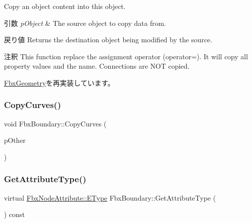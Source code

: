 Copy an object content into this object. 
\begin{DoxyParams}{引数}
{\em p\+Object} & The source object to copy data from. \\
\hline
\end{DoxyParams}
\begin{DoxyReturn}{戻り値}
Returns the destination object being modified by the source. 
\end{DoxyReturn}
\begin{DoxyRemark}{注釈}
This function replace the assignment operator (operator=). It will copy all property values and the name. Connections are N\+OT copied. 
\end{DoxyRemark}


\hyperlink{class_fbx_geometry_aac1cee4251e3d5fbd27f1181c58b83b3}{Fbx\+Geometry}を再実装しています。

\mbox{\label{class_fbx_boundary_ae41addb147733da9216a785bc6d003c3}} 
\subsubsection{\texorpdfstring{Copy\+Curves()}{CopyCurves()}}
{\footnotesize\ttfamily void Fbx\+Boundary\+::\+Copy\+Curves (\begin{DoxyParamCaption}\item[{\hyperlink{class_fbx_boundary}{Fbx\+Boundary} const \&}]{p\+Other }\end{DoxyParamCaption})}

\mbox{\label{class_fbx_boundary_a093be9c6c0c0f13a337e9b6815aed9d0}} 
\subsubsection{\texorpdfstring{Get\+Attribute\+Type()}{GetAttributeType()}}
{\footnotesize\ttfamily virtual \hyperlink{class_fbx_node_attribute_a08e1669d3d1a696910756ab17de56d6a}{Fbx\+Node\+Attribute\+::\+E\+Type} Fbx\+Boundary\+::\+Get\+Attribute\+Type (\begin{DoxyParamCaption}{ }\end{DoxyParamCaption}) const\hspace{0.3cm}{\ttfamily [virtual]}}



